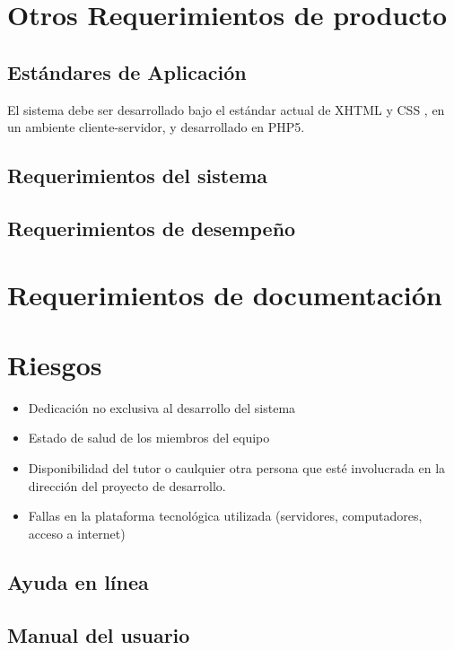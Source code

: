 \documentclass{article}
\begin{document}
\section{Otros Requerimientos de producto}

\subsection{Estándares de Aplicación}
El sistema debe ser desarrollado bajo el estándar actual de XHTML  y CSS , en un ambiente cliente-servidor, y desarrollado en PHP5.

\subsection{Requerimientos del sistema}

\subsection{Requerimientos de desempeño }

\section{Requerimientos de documentación}

\section{Riesgos}

\begin{itemize}
 \item Dedicación no exclusiva al desarrollo del sistema
\item Estado de salud de los miembros del equipo
\item Disponibilidad del tutor o caulquier otra persona que esté involucrada en la dirección del proyecto de desarrollo.
\item Fallas en la plataforma tecnológica utilizada (servidores, computadores, acceso a internet)
\end{itemize}


\subsection{Ayuda en línea}

\subsection{Manual del usuario}
\end{document}
